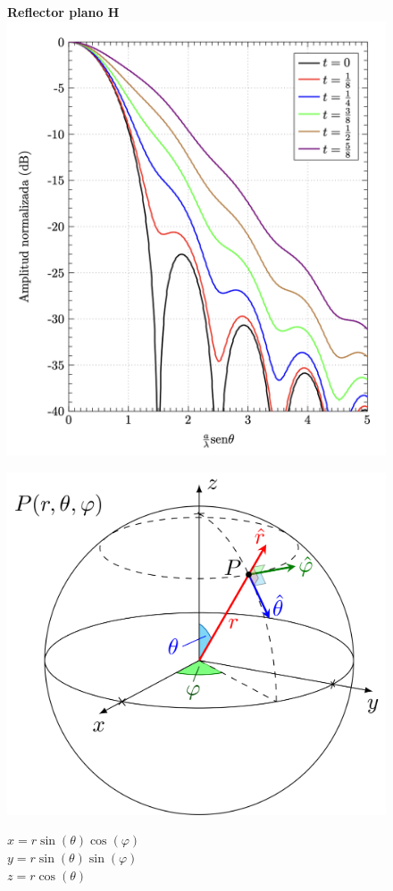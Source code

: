 \documentclass[twocolumn, 8pt]{extarticle}
\begin{document}
\begin{multicols}{2}
    \begin{figure}[H]
        \centering
        \textbf{Reflector plano H}
        \includegraphics[width=\columnwidth]{reflector_plano_h.png}
    \end{figure}
\end{multicols}

\begin{figure}[H]
    \centering
    \includegraphics[width=\columnwidth]{esfericas.png}
    \vspace{0.1cm}


    \(x = r \sin(\theta) \cos(\varphi)\)\\
    \(y = r \sin(\theta) \sin(\varphi)\)\\
    \(z = r \cos(\theta)\)
\end{figure}
\end{document}
